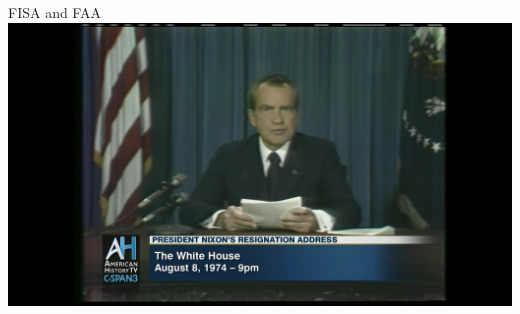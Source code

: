 \documentclass[nobackground,dvipsnames,table]{beamer}
\begin{document}
\begin{frame}{}
    \thispagestyle{empty}
\end{frame}

\begin{frame}{FISA and FAA}
    \includegraphics[width=\textwidth]{nixon-resignation}
\end{frame}
\end{document}
